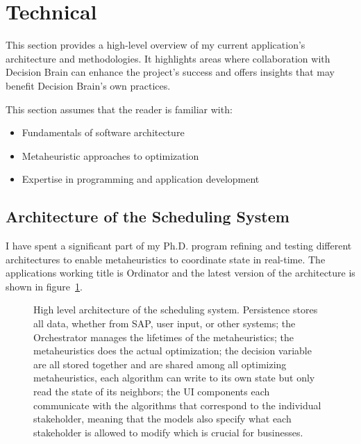 \newpage
\section{Technical}
\label{sec:technical}
This section provides a high-level overview of my current application's
architecture and methodologies. It highlights areas where collaboration with
Decision Brain can enhance the project's success and offers insights that may
benefit Decision Brain's own practices. 

This section assumes that the reader is familiar with:
\begin{itemize}
	\item Fundamentals of software architecture
	\item Metaheuristic approaches to optimization
	\item Expertise in programming and application development
\end{itemize}

\subsection*{Architecture of the Scheduling System}
I have spent a significant part of my Ph.D. program refining and testing different architectures to enable
metaheuristics to coordinate state in real-time. The applications working title is Ordinator and the latest version of the architecture is shown in figure~\ref{fig:ordinator:architecture}.

\begin{figure}[H]
	\centering
	

	\caption{
		High level architecture of the scheduling system. Persistence stores
		all data, whether from SAP, user input, or other systems; the Orchestrator manages the lifetimes of the 
		metaheuristics; the metaheuristics does the actual optimization;
		the decision variable are all stored together and are shared among all optimizing metaheuristics, 
		each algorithm can write to its own state but only read the state of its neighbors; the UI components
		each communicate with the algorithms that correspond to the individual stakeholder, meaning that the 
		models also specify what each stakeholder is allowed to modify which is crucial for businesses. \citep{barthelemyHumanCenteredProcesses2002}
	}
	\label{fig:ordinator:architecture}
\end{figure}

